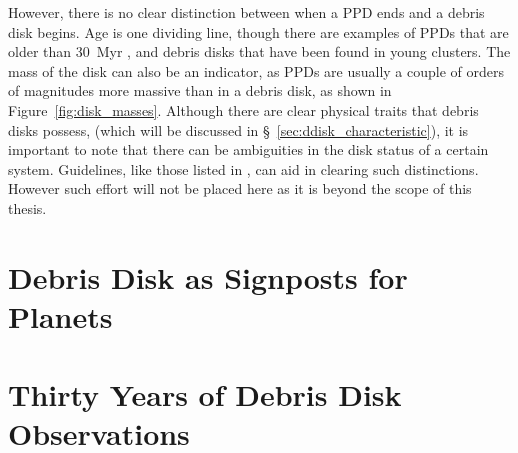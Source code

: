     However, there is no clear distinction between when a PPD ends and a debris disk begins. Age is one dividing line, though there are examples of PPDs that are older than 30~Myr \citep{DeMarchi2013,Scicluna2014}, and debris disks that have been found in young clusters. The mass of the disk can also be an indicator, as PPDs are usually a couple of orders of magnitudes more massive than in a debris disk, as shown in Figure~\ref{fig:disk_masses}. Although there are clear physical traits that debris disks possess, (which will be discussed in  \S~\ref{sec:ddisk_characteristic}), it is important to note that there can be ambiguities in the disk status of a certain system. Guidelines, like those listed in \citet{Wyatt2015}, can aid in clearing such distinctions. However such effort will not be placed here as it is beyond the scope of this thesis.
    
    

    
\section{Debris Disk as Signposts for Planets}


\section{Thirty Years of Debris Disk Observations}












